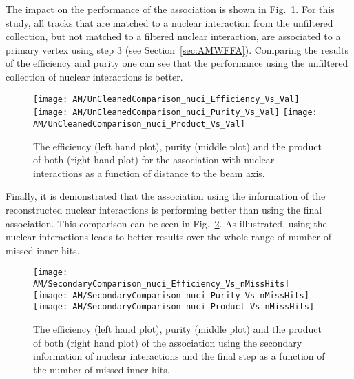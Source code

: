 The impact on the performance of the association is shown in Fig.~\ref{plot:AMWFSVnuciEffAndPurRT}. For this study, all tracks that are matched to a nuclear interaction from the unfiltered collection, but not matched to a filtered nuclear interaction, are associated to a primary vertex using step 3 (see Section~\ref{sec:AMWFFA}). Comparing the results of the efficiency and purity one can see that the performance using the unfiltered collection of nuclear interactions is better.

\begin{figure}[!ht]
    \centering
    \texttt{[image: AM/UnCleanedComparison\_nuci\_Efficiency\_Vs\_Val]}
    \texttt{[image: AM/UnCleanedComparison\_nuci\_Purity\_Vs\_Val]}
    \texttt{[image: AM/UnCleanedComparison\_nuci\_Product\_Vs\_Val]}
    \caption[Efficiency, purity and their product for the association with nuclear interactions a function of distance to the beam axis]{The efficiency (left hand plot), purity (middle plot) and the product of both (right hand plot) for the association with nuclear interactions as a function of distance to the beam axis. \label{plot:AMWFSVnuciEffAndPurRT}}
\end{figure}

Finally, it is demonstrated that the association using the information of the reconstructed nuclear interactions is performing better than using the final association. This comparison can be seen in Fig.~\ref{plot:AMWFSVnuciEffAndPurVsFA}. As illustrated, using the nuclear interactions leads to better results over the whole range of number of missed inner hits.

\begin{figure}[!ht]
    \centering
    \texttt{[image: AM/SecondaryComparison\_nuci\_Efficiency\_Vs\_nMissHits]}
    \texttt{[image: AM/SecondaryComparison\_nuci\_Purity\_Vs\_nMissHits]}
    \texttt{[image: AM/SecondaryComparison\_nuci\_Product\_Vs\_nMissHits]}
    \caption[Efficiency, purity and their product for the association with nuclear interactions vs final association as a function of missed inner hits]{The efficiency (left hand plot), purity (middle plot) and the product of both (right hand plot) of the association using the secondary information of nuclear interactions and the final step as a function of the number of missed inner hits.\label{plot:AMWFSVnuciEffAndPurVsFA}}
\end{figure}

